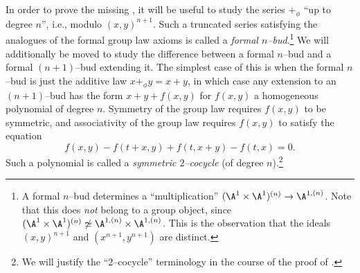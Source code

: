 \begin{definition}\label{DefinitionSymmetric2Cocycle}
In order to prove the missing , it will be useful to study the series $+_\phi$ ``up to degree $n$'', i.e., modulo $(x, y)^{n+1}$.  Such a truncated series satisfying the analogues of the formal group law axioms is called a \textit{formal $n$--bud}.\footnote{A formal $n$--bud determines a ``multiplication'' $(\A^1 \times \A^1)^{(n)} \to \A^{1,(n)}$.  Note that this does \emph{not} belong to a group object, since $(\A^1 \times \A^1)^{(n)} \not\simeq \A^{1,(n)} \times \A^{1,(n)}$.  This is the observation that the ideals $(x, y)^{n+1}$ and $(x^{n+1}, y^{n+1})$ are distinct.}  We will additionally be moved to study the difference between a formal $n$--bud and a formal $(n+1)$--bud extending it.  The simplest case of this is when the formal $n$--bud is just the additive law $x +_\phi y = x + y$, in which case any extension to an $(n+1)$--bud has the form $x + y + f(x, y)$ for $f(x, y)$ a homogeneous polynomial of degree $n$.  Symmetry of the group law requires $f(x, y)$ to be symmetric, and associativity of the group law requires $f(x, y)$ to satisfy the equation \[f(x, y) - f(t + x, y) + f(t, x + y) - f(t, x) = 0.\]  Such a polynomial is called a \textit{symmetric $2$--cocycle} (of degree $n$).\footnote{We will justify the ``$2$--cocycle'' terminology in the course of the proof of .}
\end{definition}

